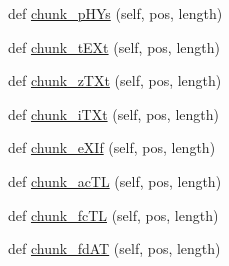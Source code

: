 \begin{DoxyCompactItemize}
\item 
def \hyperlink{classPIL_1_1PngImagePlugin_1_1PngStream_a96ded8b761de9686da8d200cd6b6810a}{chunk\+\_\+p\+H\+Ys} (self, pos, length)
\item 
def \hyperlink{classPIL_1_1PngImagePlugin_1_1PngStream_af2e2a4fb36b72a29942e2288f08b98d9}{chunk\+\_\+t\+E\+Xt} (self, pos, length)
\item 
def \hyperlink{classPIL_1_1PngImagePlugin_1_1PngStream_ae4a05a8790a6448de9e800534dbb79cd}{chunk\+\_\+z\+T\+Xt} (self, pos, length)
\item 
def \hyperlink{classPIL_1_1PngImagePlugin_1_1PngStream_a2c59340597454ad98eb9cd0318ad9d57}{chunk\+\_\+i\+T\+Xt} (self, pos, length)
\item 
def \hyperlink{classPIL_1_1PngImagePlugin_1_1PngStream_a04600058d991e0dc6b9424e882e3d0e3}{chunk\+\_\+e\+X\+If} (self, pos, length)
\item 
def \hyperlink{classPIL_1_1PngImagePlugin_1_1PngStream_a4812e87ba5f0604f47200907e4358b75}{chunk\+\_\+ac\+TL} (self, pos, length)
\item 
def \hyperlink{classPIL_1_1PngImagePlugin_1_1PngStream_adb9427911ab5389c64609be7e15753f4}{chunk\+\_\+fc\+TL} (self, pos, length)
\item 
def \hyperlink{classPIL_1_1PngImagePlugin_1_1PngStream_a6a59f5824c3c119bea38527337bc50cb}{chunk\+\_\+fd\+AT} (self, pos, length)
\end{DoxyCompactItemize}
